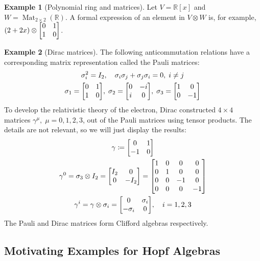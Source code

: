 \documentclass{article}
\theoremstyle{definition}
\newtheorem*{Example*}{Example}
\theoremstyle{remark}
\theoremstyle{underline}
\theoremstyle{underline}
\DeclareMathOperator{\Mat}{Mat}
\begin{document}
	\begin{Example*}[Polynomial ring and matrices] 
		Let $ V = \mathbb{R}[x]$ and $ W = \Mat_{2\times 2}(\mathbb{R})$. A formal expression of an element in $V \otimes W $ is, for example, $(2 + 2x) \otimes \mqty[0 & 1 \\ 1 & 0]$.
	\end{Example*}
	
	\begin{Example*}[Dirac matrices]
		The following anticommutation relations have a corresponding matrix representation called the Pauli matrices:
		\begin{gather*}
		\sigma_i^2 = I_2, \quad \sigma_i \sigma_j + \sigma_j\sigma_i = 0, \; i \neq j \\
		\sigma_1 = \mqty[0 & 1 \\ 1 & 0],\; \sigma_2 = \mqty[0 & -i \\ i & 0],\; \sigma_3 = \mqty[1 & 0 \\ 0 & -1]
		\end{gather*}
		To develop the relativistic theory of the electron, Dirac constructed $4 \times 4$ matrices $\gamma^\mu,\; \mu = 0,1,2,3$, out of the Pauli matrices using tensor products. The details are not relevant, so we will just display the results:
		\begin{gather*}
		\gamma \coloneqq \mqty[0 & 1 \\ -1 & 0] \\
		\gamma^{0} = \sigma_3 \otimes I_2 = \mqty[I_2 & 0 \\ 0 & -I_2] = \mqty[1 & 0 & 0 & 0 \\ 0 & 1 & 0 & 0 \\ 0 & 0 & -1 & 0 \\ 0 & 0 & 0 & -1] \\
		\gamma^{i} = \gamma \otimes \sigma_i = \mqty[0 & \sigma_i \\ -\sigma_i & 0],\quad i = 1,2,3
		\end{gather*}
		The Pauli and Dirac matrices form Clifford algebras respectively.
	\end{Example*}
	
	\subsection{Motivating Examples for Hopf Algebras}
	
\end{document}
